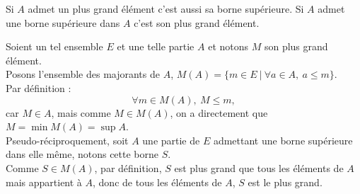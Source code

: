\documentclass{article}
\renewenvironment{question_kholle}[2][ ]
{
	\subsection{\texorpdfstring{#2}{}}
	\notblank{#1}
	{
		\noindent #1
		\bigbreak
	}
	{}
	\begin{proof}
}
{
	\end{proof}
}
\begin{document}
\begin{question_kholle}
	[\noindent Soit $(E, \leq)$ un ensemble ordonné, et $A$ une partie non-vide de $E$. \\
		Si $A$ admet un plus grand élément alors $A$ admet une borne supérieure et $\sup{A} = \max{A}$. \\
		Si $A$ admet une borne supérieure appartenant à elle-même alors $A$ admet un plus grand élément et $\max{A} = \sup{A}$.]
	{Si $A$ admet un plus grand élément c'est aussi sa borne supérieure. Si $A$ admet une borne supérieure dans $A$ c'est son plus grand élément.}

	Soient un tel ensemble $E$ et une telle partie $A$ et notons $M$ son plus grand élément. \\
	Posons l'ensemble des majorants de $A$, $M(A) = \{ m\in E \ | \ \forall a \in A, \ a \leq m\}$. \\
	Par définition :
	\[
		\forall m \in M(A), \ M \leq m,
	\]
	car $M\in A$, mais comme $M\in M(A)$, on a directement que $M = \min{M(A)} = \sup{A}$. \\

	Pseudo-réciproquement, soit $A$ une partie de $E$ admettant une borne supérieure dans elle même, notons cette borne $S$. \\
	Comme $S \in M(A)$, par définition, $S$ est plus grand que tous les éléments de $A$ mais appartient à $A$, donc de tous les éléments de $A$, $S$ est le plus grand.
\end{question_kholle}
\end{document}
